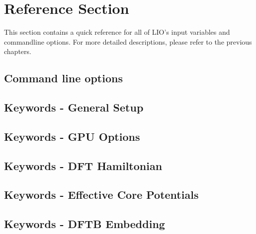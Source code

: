 \chapter{Reference Section}

This section contains a quick reference for all of LIO's input variables
and commandline options. For more detailed descriptions, please refer to 
the previous chapters.

\section{Command line options}


\newpage

\section{Keywords - General Setup}


\newpage
\section{Keywords - GPU Options}


\newpage
\section{Keywords - DFT Hamiltonian}


\newpage
\section{Keywords - Effective Core Potentials}


\newpage
\section{Keywords - DFTB Embedding}


\newpage
